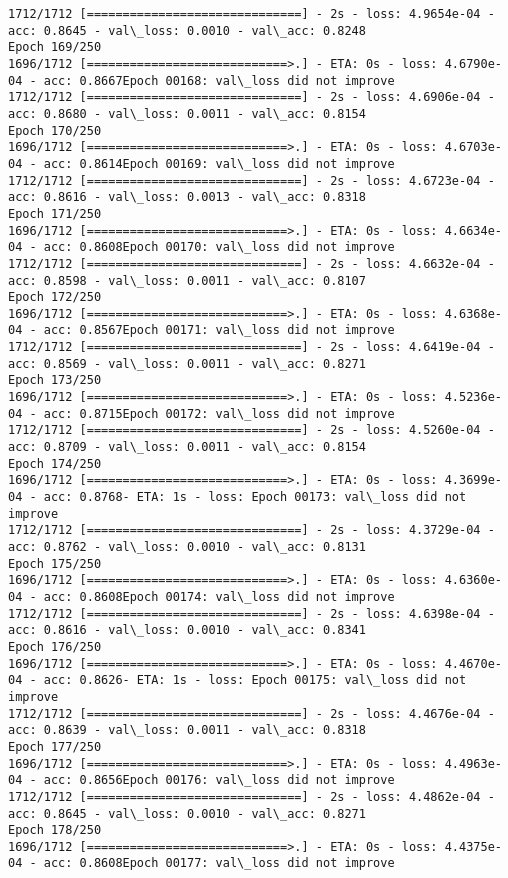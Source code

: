 \documentclass[11pt]{article}
\begin{document}
\begin{Verbatim}[commandchars=\\\{\}]
1712/1712 [==============================] - 2s - loss: 4.9654e-04 - acc: 0.8645 - val\_loss: 0.0010 - val\_acc: 0.8248
Epoch 169/250
1696/1712 [============================>.] - ETA: 0s - loss: 4.6790e-04 - acc: 0.8667Epoch 00168: val\_loss did not improve
1712/1712 [==============================] - 2s - loss: 4.6906e-04 - acc: 0.8680 - val\_loss: 0.0011 - val\_acc: 0.8154
Epoch 170/250
1696/1712 [============================>.] - ETA: 0s - loss: 4.6703e-04 - acc: 0.8614Epoch 00169: val\_loss did not improve
1712/1712 [==============================] - 2s - loss: 4.6723e-04 - acc: 0.8616 - val\_loss: 0.0013 - val\_acc: 0.8318
Epoch 171/250
1696/1712 [============================>.] - ETA: 0s - loss: 4.6634e-04 - acc: 0.8608Epoch 00170: val\_loss did not improve
1712/1712 [==============================] - 2s - loss: 4.6632e-04 - acc: 0.8598 - val\_loss: 0.0011 - val\_acc: 0.8107
Epoch 172/250
1696/1712 [============================>.] - ETA: 0s - loss: 4.6368e-04 - acc: 0.8567Epoch 00171: val\_loss did not improve
1712/1712 [==============================] - 2s - loss: 4.6419e-04 - acc: 0.8569 - val\_loss: 0.0011 - val\_acc: 0.8271
Epoch 173/250
1696/1712 [============================>.] - ETA: 0s - loss: 4.5236e-04 - acc: 0.8715Epoch 00172: val\_loss did not improve
1712/1712 [==============================] - 2s - loss: 4.5260e-04 - acc: 0.8709 - val\_loss: 0.0011 - val\_acc: 0.8154
Epoch 174/250
1696/1712 [============================>.] - ETA: 0s - loss: 4.3699e-04 - acc: 0.8768- ETA: 1s - loss: Epoch 00173: val\_loss did not improve
1712/1712 [==============================] - 2s - loss: 4.3729e-04 - acc: 0.8762 - val\_loss: 0.0010 - val\_acc: 0.8131
Epoch 175/250
1696/1712 [============================>.] - ETA: 0s - loss: 4.6360e-04 - acc: 0.8608Epoch 00174: val\_loss did not improve
1712/1712 [==============================] - 2s - loss: 4.6398e-04 - acc: 0.8616 - val\_loss: 0.0010 - val\_acc: 0.8341
Epoch 176/250
1696/1712 [============================>.] - ETA: 0s - loss: 4.4670e-04 - acc: 0.8626- ETA: 1s - loss: Epoch 00175: val\_loss did not improve
1712/1712 [==============================] - 2s - loss: 4.4676e-04 - acc: 0.8639 - val\_loss: 0.0011 - val\_acc: 0.8318
Epoch 177/250
1696/1712 [============================>.] - ETA: 0s - loss: 4.4963e-04 - acc: 0.8656Epoch 00176: val\_loss did not improve
1712/1712 [==============================] - 2s - loss: 4.4862e-04 - acc: 0.8645 - val\_loss: 0.0010 - val\_acc: 0.8271
Epoch 178/250
1696/1712 [============================>.] - ETA: 0s - loss: 4.4375e-04 - acc: 0.8608Epoch 00177: val\_loss did not improve

\end{Verbatim}
\end{document}
